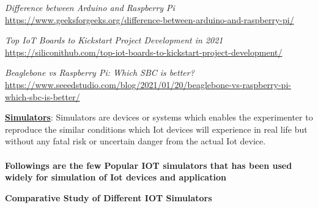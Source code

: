 \documentclass[a4paper,11pt]{article}
\begin{document}
\begin{iotsolution}
\begin{thebibliography}{9}
\textit{Difference between Arduino and Raspberry Pi}
\url{https://www.geeksforgeeks.org/difference-between-arduino-and-raspberry-pi/}

\textit{Top IoT Boards to Kickstart Project Development in 2021}
\url{https://siliconithub.com/top-iot-boards-to-kickstart-project-development/}

\textit{Beaglebone vs Raspberry Pi: Which SBC is better?}
\url{https://www.seeedstudio.com/blog/2021/01/20/beaglebone-vs-raspberry-pi-which-sbc-is-better/}
\end{thebibliography}


\end{iotsolution}

\begin{iotsolution}

\textbf{\underline{Simulators}}: Simulators are devices or systems which enables the experimenter to reproduce the similar conditions which Iot devices will experience in real life but without any fatal risk or uncertain danger from the actual Iot device.\\\\
\textbf{Followings are the few Popular IOT simulators that has been used widely for simulation of Iot devices and application}

\begin{center}
    \textbf{Comparative Study of Different IOT Simulators }
\end{center}




\end{iotsolution}
\end{document}
